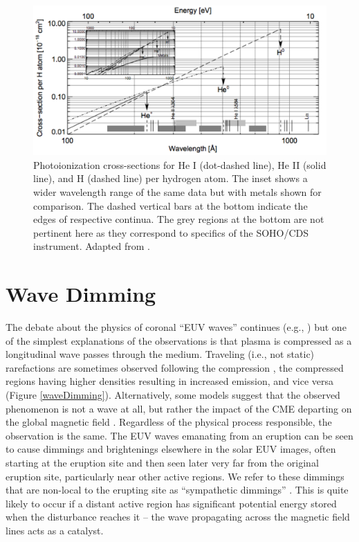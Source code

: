 \begin{figure}[!h]
    \begin{center}
        \includegraphics[width=150mm]{Images/PhotoionizationCrossSection.png}
    \end{center}
    \caption[Photoionization cross-sections for H and He]{
        Photoionization cross-sections for He I (dot-dashed line), He II (solid line), and H (dashed line) per hydrogen
        atom. The inset shows a wider wavelength range of the same data but with metals shown for comparison. The dashed
        vertical bars at the bottom indicate the edges of respective continua. The grey regions at the bottom are not 
        pertinent here as they correspond to specifics of the SOHO/CDS instrument. Adapted from \citet{Andretta2003}. 
    }
    \label{photoionizationCrossSection}
\end{figure}

\section{Wave Dimming}
\label{sec:waveDimming}
The debate about the physics of coronal “EUV waves” continues (e.g., \citealt{Zhukov2004, Muhr2011, Liu2014}) but one of the simplest explanations of the observations is that plasma is compressed as a longitudinal wave passes through the medium. Traveling (i.e., not static) rarefactions are sometimes observed following the compression \citep{Muhr2011}, the compressed regions having higher densities resulting in increased emission, and vice versa (Figure \ref{waveDimming}). Alternatively, some models suggest that the observed phenomenon is not a wave at all, but rather the impact of the CME departing on the global magnetic field \citep{Chen2002, Chen2005}. Regardless of the physical process responsible, the observation is the same. The EUV waves emanating from an eruption can be seen to cause dimmings and brightenings elsewhere in the solar EUV images, often starting at the eruption site and then seen later very far from the original eruption site, particularly near other active regions. We refer to these dimmings that are non-local to the erupting site as “sympathetic dimmings” \citep{Schrijver2015}. This is quite likely to occur if a distant active region has significant potential energy stored when the disturbance reaches it -- the wave propagating across the magnetic field lines acts as a catalyst. 

